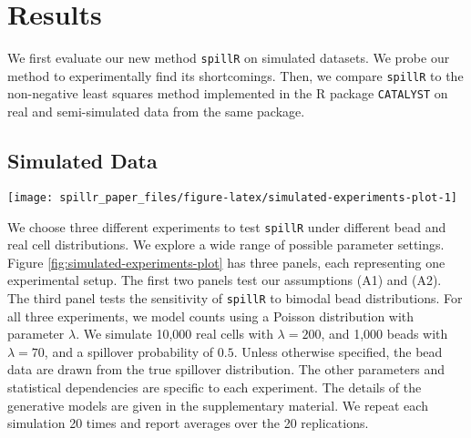 \documentclass{bioinfo}
\begin{document}
\section{Results}

\label{results}

We first evaluate our new method \texttt{spillR} on simulated datasets.
We probe our method to experimentally find its shortcomings. Then, we
compare \texttt{spillR} to the non-negative least squares method
implemented in the R package \texttt{CATALYST} on real and
semi-simulated data from the same package.

\subsection{Simulated Data}

\label{simulated-data}

\begin{figure*}

{\centering \texttt{[image: spillr\_paper\_files/figure-latex/simulated-experiments-plot-1]} 

}

\caption{Three experiments testing our assumptions and sensitivity to bimodal bead distribution. For each experiment the top row are mean values over the entire range of the experimental setups. The mean values for \texttt{spillR} are computed on values not marked as \texttt{NA}, so the mean ignores the counts attributed to spillover. The bottom row are density plots for three parameter settings to illustrate the generated distributions. $Y$ is the distribution with spillover. $Y \mid Z = 1$ is the distribution without spillover. $Y \mid Z = 2$ is the spillover. mean($Y$) is the average of the distribution with spillover. mean($Y \mid Z = 1$) is the average count without spillover. \texttt{spillR} mean($Y$) is the average count after correcting $Y$.}\label{fig:simulated-experiments-plot}
\end{figure*}

We choose three different experiments to test \texttt{spillR} under
different bead and real cell distributions. We explore a wide range of
possible parameter settings. Figure \ref{fig:simulated-experiments-plot}
has three panels, each representing one experimental setup. The first
two panels test our assumptions (A1) and (A2). The third panel tests the
sensitivity of \texttt{spillR} to bimodal bead distributions. For all
three experiments, we model counts using a Poisson distribution with
parameter \(\lambda\). We simulate 10,000 real cells with
\(\lambda = 200\), and 1,000 beads with \(\lambda = 70\), and a
spillover probability of \(0.5\). Unless otherwise specified, the bead
data are drawn from the true spillover distribution. The other
parameters and statistical dependencies are specific to each experiment.
The details of the generative models are given in the supplementary
material. We repeat each simulation 20 times and report averages over
the 20 replications.
\end{document}
